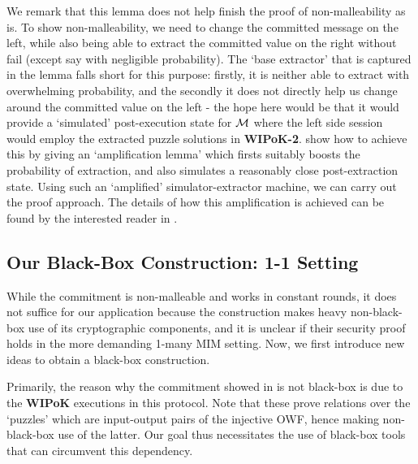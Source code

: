  We remark that this lemma does not help finish the proof of non-malleability as is. To show non-malleability, we need to change the committed message on the left, while also being able to extract the committed value on the right without fail (except say with negligible probability). The `base extractor' that is captured in the lemma falls short for this purpose: firstly, it is neither able to extract with overwhelming probability, and the secondly it does not directly help us change around the committed value on the left - the hope here would be that it would provide a `simulated' post-execution state for $\mathcal{M}$ where the left side session would employ the extracted puzzle solutions in {\bf WIPoK-2}. \cite{FOCS:LPY23} show how to achieve this by giving an `amplification lemma' which firsts suitably boosts the probability of extraction, and also simulates a reasonably close post-extraction state. Using such an `amplified' simulator-extractor machine, we can carry out the proof approach. The details of how this amplification is achieved can be found by the interested reader in \cite{FOCS:LPY23}. 
\fi


\subsection{Our Black-Box Construction: 1-1 Setting}
\label{sec:overview:NM:1-1}
 While the \cite{FOCS:LPY23} commitment is non-malleable and works in constant rounds, it does not suffice for our application because the construction makes heavy non-black-box use of its cryptographic components, and it is unclear if their security proof holds in the more demanding 1-many MIM setting. Now, we first introduce new ideas to obtain a black-box construction.  


\iffalse
Primarily, the reason why the commitment showed in  is not black-box is due to the {\bf WIPoK} executions in this protocol. Note that these prove relations over the `puzzles' which are input-output pairs of the injective OWF, hence making non-black-box use of the latter. Our goal thus necessitates the use of black-box tools that can circumvent this dependency. 

